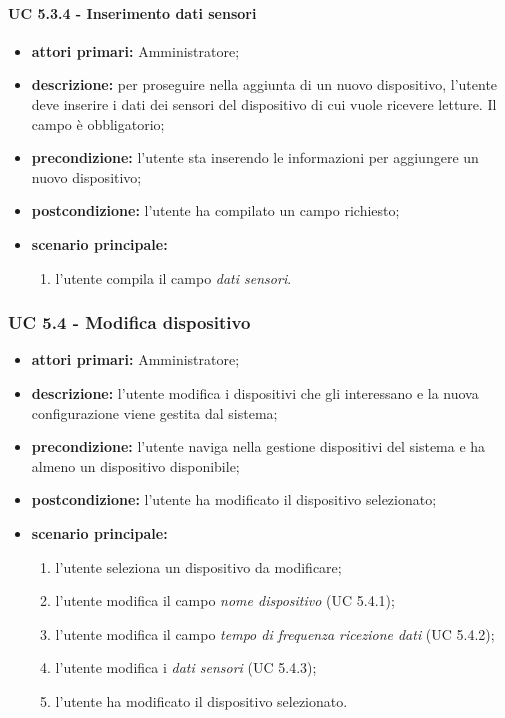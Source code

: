 				\paragraph{UC 5.3.4 - Inserimento dati sensori}
				\begin{itemize}
					\item \textbf{attori primari:} Amministratore;
					\item \textbf{descrizione:} per proseguire nella aggiunta di un nuovo dispositivo, l'utente deve inserire i dati dei sensori del dispositivo di cui vuole ricevere letture. Il campo è obbligatorio;
					\item \textbf{precondizione:} l'utente sta inserendo le informazioni per aggiungere un nuovo dispositivo;
					\item \textbf{postcondizione:} l'utente ha compilato un campo richiesto;
					\item \textbf{scenario principale:}
					\begin{enumerate}
						\item{l'utente compila il campo \textit{dati sensori}.}
					\end{enumerate}
				\end{itemize}

			\subsubsection{UC 5.4 - Modifica dispositivo}
			\begin{itemize}
				\item \textbf{attori primari:} Amministratore;
				\item \textbf{descrizione:} l'utente modifica i dispositivi che gli interessano e la nuova configurazione viene gestita dal sistema;
				\item \textbf{precondizione:} l'utente naviga nella gestione dispositivi del sistema e ha almeno un dispositivo disponibile;
				\item \textbf{postcondizione:} l'utente ha modificato il dispositivo selezionato;
				\item \textbf{scenario principale:}
				\begin{enumerate}
					\item{l'utente seleziona un dispositivo da modificare;}
					\item{l'utente modifica il campo \textit{nome dispositivo} (UC 5.4.1);}
					\item{l'utente modifica il campo \textit{tempo di frequenza ricezione dati} (UC 5.4.2);}
					\item{l'utente modifica i \textit{dati sensori} (UC 5.4.3);}
					\item{l'utente ha modificato il dispositivo selezionato.}
				\end{enumerate}
			\end{itemize}

